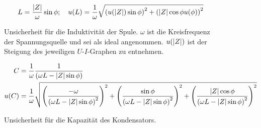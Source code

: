 \begin{figure}[h]
		\begin{equation*}
		L = \frac{\abs{Z}}{\omega} \sin\phi
		;\quad
		u(L) = \frac{1}{\omega}\sqrt{\left( u(\abs{Z}) \sin\phi \right) ^2 + \left( \abs{Z} \cos\phi u(\phi) \right) ^2}
	\end{equation*}
	\caption{Unsicherheit für die Induktivität der Spule. $\omega$ ist die Kreisfrequenz der Spannungsquelle und sei als ideal angenommen. $u(\abs{Z})$ ist der Steigung des jeweiligen $U$-$I$-Graphen zu entnehmen.}
	\label{eq:unc-L}
\end{figure}

\begin{figure}[h]
	\begin{align*}
		C &= \frac{1}{\omega}\frac{1}{\left( \omega L - \abs{Z}\sin\phi \right) }
		\\
		u(C) &=\frac{1}{\omega}\sqrt{\left( \frac{-\omega}{\left( \omega L - \abs{Z} \sin\phi \right) ^2}\right) ^2+\left( \frac{\sin\phi}{\left( \omega L - \abs{Z} \sin\phi \right) ^2}\right) ^2+\left( \frac{\abs{Z}\cos\phi}{\left( \omega L - \abs{Z} \sin\phi \right) ^2}\right) ^2}
	\end{align*}
	\caption{Unsicherheit für die Kapazität des Kondensators.}
	\label{eq:unc-C}
\end{figure}
